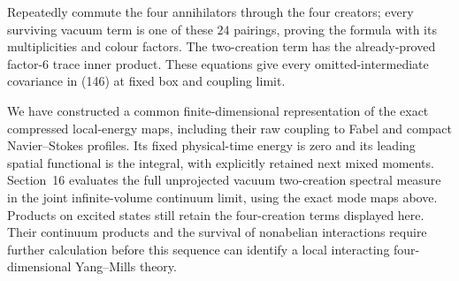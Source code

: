 Repeatedly commute the four annihilators through the four creators;
every surviving vacuum term is one of these \(24\) pairings, proving the
formula with its multiplicities and colour factors. The two-creation
term has the already-proved factor-\(6\) trace inner product. These
equations give every omitted-intermediate covariance in (146) at fixed
box and coupling limit.

We have constructed a common finite-dimensional representation of the
exact compressed local-energy maps, including their raw coupling to
Fabel and compact Navier--Stokes profiles. Its fixed physical-time
energy is zero and its leading spatial functional is the integral, with
explicitly retained next mixed moments. Section~16 evaluates the full
unprojected vacuum two-creation spectral measure in the joint
infinite-volume continuum limit, using the exact mode maps above.
Products on excited states still retain the four-creation terms
displayed here. Their continuum products and the survival of nonabelian
interactions require further calculation before this sequence can
identify a local interacting four-dimensional Yang--Mills theory.
